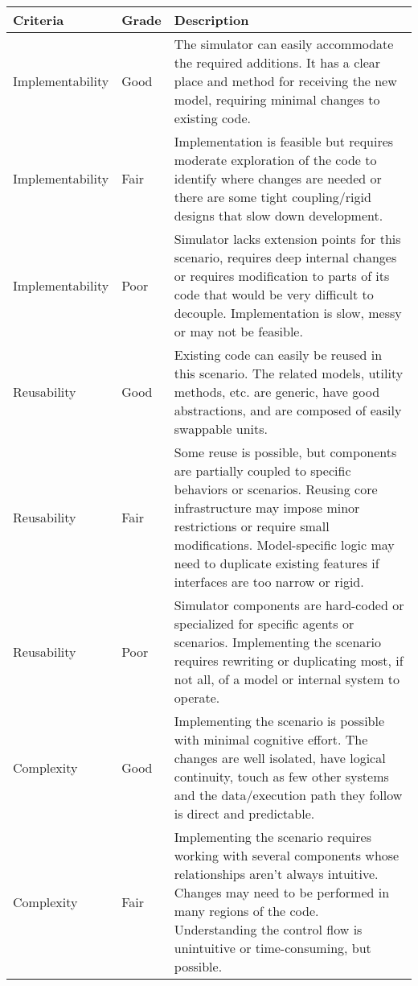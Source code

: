 \documentclass[twoside, 11pt]{article}
\begin{document}
\begin{center}
  \begin{table}
    \begin{tabularx}{\textwidth}{ | p{2.9cm} | l | X | } 
      \hline
      Criteria & Grade & Description \\ 
      \hline
      Implementability & Good & 
      The simulator can easily accommodate the required additions. It has a clear place and method for receiving the new model, requiring minimal changes to existing code.
      \\ 
      \hline
      Implementability & Fair & 
      Implementation is feasible but requires moderate exploration of the code to identify where changes are needed or there are some tight coupling/rigid designs that slow down development.
      \\ 
      \hline
      Implementability & Poor & 
      Simulator lacks extension points for this scenario, requires deep internal changes or requires modification to parts of its code that would be very difficult to decouple. Implementation is slow, messy or may not be feasible.
      \\ 
      \hline
      Reusability & Good & 
      Existing code can easily be reused in this scenario. The related models, utility methods, etc. are  generic, have good abstractions, and are composed of easily swappable units.
      \\ 
      \hline
      Reusability & Fair & 
      Some reuse is possible, but components are partially coupled to specific behaviors or scenarios. Reusing core infrastructure may impose minor restrictions or require small modifications. Model-specific logic may need to duplicate existing features if interfaces are too narrow or rigid.
      \\ 
      \hline
      Reusability & Poor & 
      Simulator components are hard-coded or specialized for specific agents or scenarios. Implementing the scenario requires rewriting or duplicating most, if not all, of a model or internal system to operate. 
      \\ 
      \hline
      Complexity & Good & 
      Implementing the scenario is possible with minimal cognitive effort. The changes are well isolated, have logical continuity, touch as few other systems and the data/execution path they follow is direct and predictable.
      \\ 
      \hline
      Complexity & Fair & 
      Implementing the scenario requires working with several components whose relationships aren't always intuitive. Changes may need to be performed in many regions of the code. Understanding the control flow is unintuitive or time-consuming, but possible.

\end{tabularx}
\end{table}
\end{center}
\end{document}
